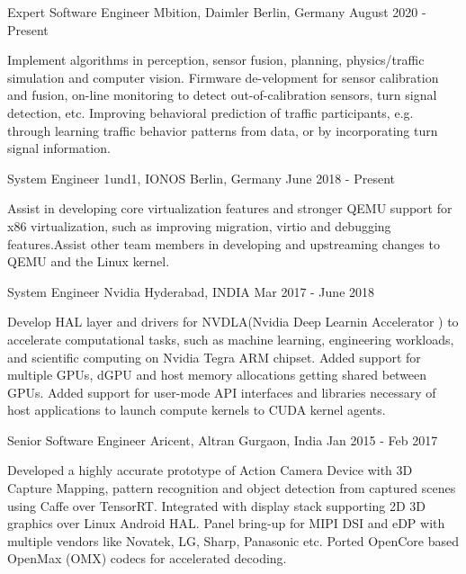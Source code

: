 
\begin{cventries}
  \cventry
    {Expert Software Engineer}
    {Mbition, Daimler}
    {Berlin, Germany}
    {August 2020 - Present}
    {
      \begin{cvitems}
        \item {Implement algorithms in perception, sensor fusion, planning, physics/traffic simulation and computer vision. Firmware de-velopment for sensor calibration and fusion, on-line monitoring to detect out-of-calibration sensors, turn signal detection, etc. Improving behavioral prediction of traffic participants, e.g. through learning traffic behavior patterns from data, or by incorporating turn signal information.}
      \end{cvitems}
    }	

  \cventry
    {System Engineer}
    {1und1, IONOS}
    {Berlin, Germany}
    {June 2018 - Present}
    {
      \begin{cvitems}
        \item {Assist in developing core virtualization features and stronger QEMU support for x86 virtualization, such as improving migration, virtio and debugging features.Assist other team members in developing and upstreaming changes to QEMU and the Linux kernel. }
      \end{cvitems}
    }	

  \cventry
    {System Engineer}
    {Nvidia}
    {Hyderabad, INDIA}
    {Mar 2017 - June 2018 }
    {
      \begin{cvitems}
        \item {Develop HAL layer and drivers for NVDLA(Nvidia Deep Learnin Accelerator ) to accelerate computational tasks, such as machine learning, engineering workloads, and scientific computing on Nvidia Tegra ARM chipset. Added support for multiple GPUs, dGPU and host memory allocations getting shared between GPUs. Added support for user-mode API interfaces and libraries necessary of host applications to launch compute kernels to CUDA kernel agents. }
      \end{cvitems}
    }	
    
  \cventry
    {Senior Software Engineer}
    {Aricent, Altran}
    {Gurgaon, India}
    {Jan 2015 - Feb 2017}
    {
      \begin{cvitems}
        \item {Developed a highly accurate prototype of Action Camera Device with 3D Capture Mapping, pattern recognition and object detection from captured scenes using Caffe over TensorRT. Integrated with display stack supporting 2D 3D graphics over Linux Android HAL. Panel bring-up for MIPI DSI and eDP with multiple vendors like Novatek, LG, Sharp, Panasonic etc. Ported OpenCore based OpenMax (OMX) codecs for accelerated decoding. }
      \end{cvitems}
    }	  
	  

\end{cventries}

